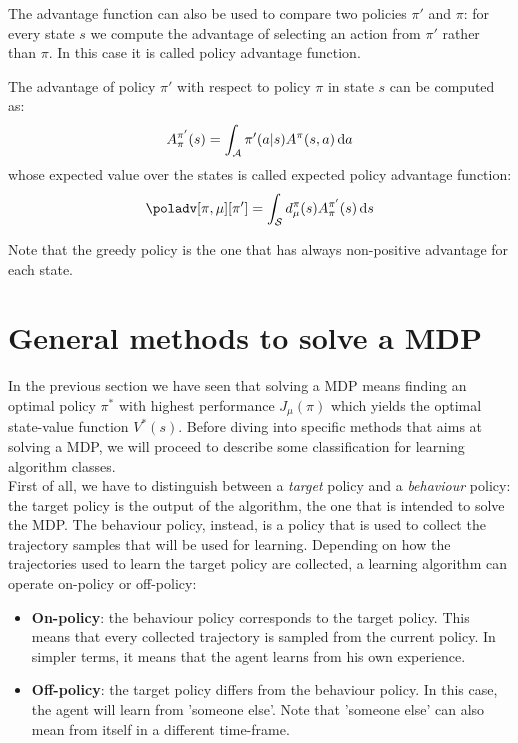 The advantage function can also be used to compare two policies $\pi'$ and $\pi$: for every state $s$ we compute the advantage of selecting an action from $\pi'$ rather than $\pi$. In this case it is called policy advantage function.
\begin{definition}
The advantage of policy $\pi'$ with respect to policy $\pi$ in state $s$ can be computed as:
\[
A_\pi^{\pi'}(s) = \int_{\mathcal{A}} \pi'(a|s)A^\pi(s, a) \, \textrm{d} a
\]
whose expected value over the states is called expected policy advantage function:
\[
\poladv[\pi,\mu][\pi'] = \int_{\sspace} d_\mu^{\pi}(s)A_\pi^{\pi'}(s) \de s
\]
\end{definition}

Note that the greedy policy is the one that has always non-positive advantage for each state. 


\section{General methods to solve a MDP}
\label{sec:solve-mdp}

In the previous section we have seen that solving a MDP means finding an optimal policy $\pi^*$ with highest performance $J_\mu(\pi)$ which yields the optimal state-value function $V^*(s)$. Before diving into specific methods that aims at solving a MDP, we will proceed to describe some classification for learning algorithm classes.\\
First of all, we have to distinguish between a \textit{target} policy and a \textit{behaviour} policy: the target policy is the output of the algorithm, the one that is intended to solve the MDP. The behaviour policy, instead, is a policy that is used to collect the trajectory samples that will be used for learning. Depending on how the trajectories used to learn the target policy are collected, a learning algorithm can operate on-policy or off-policy:
\begin{itemize}
\item \textbf{On-policy}: the behaviour policy corresponds to the target policy. This means that every collected trajectory is sampled from the current policy. In simpler terms, it means that the agent learns from his own experience.
\item \textbf{Off-policy}: the target policy differs from the behaviour policy. In this case, the agent will learn from 'someone else'. Note that 'someone else' can also mean from itself in a different time-frame.
\end{itemize}


